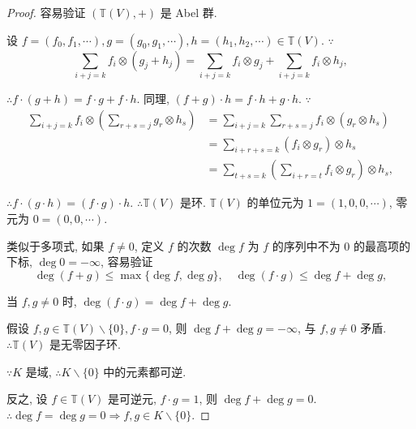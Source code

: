 \documentclass[color=black,device=normal,lang=cn,mode=geye]{elegantnote}
\begin{document}
\begin{proof}
    容易验证 $(\mathbb{T}(V),+)$ 是 Abel 群.

    设 $f=(f_0,f_1,\cdots),g=(g_0,g_1,\cdots),h=(h_1,h_2,\cdots)\in\mathbb{T}(V)$. $\because$
    \[\sum\limits_{i+j=k}f_i\otimes(g_j+h_j)=\sum\limits_{i+j=k}f_i\otimes g_j+\sum\limits_{i+j=k}f_i\otimes h_j,\]

    $\therefore f\cdot(g+h)=f\cdot g+f\cdot h$. 同理, $(f+g)\cdot h=f\cdot h+g\cdot h$. $\because$
    \begin{align*}
        \sum\limits_{i+j=k}f_i\otimes\left(\sum\limits_{r+s=j}g_r\otimes h_s\right) & =\sum\limits_{i+j=k}\sum\limits_{r+s=j}f_i\otimes(g_r\otimes h_s) \\
        & =\sum\limits_{i+r+s=k}(f_i\otimes g_r)\otimes h_s \\
        & =\sum\limits_{t+s=k}\left(\sum\limits_{i+r=t}f_i\otimes g_r\right)\otimes h_s,
    \end{align*}

    $\therefore f\cdot(g\cdot h)=(f\cdot g)\cdot h$. $\therefore\mathbb{T}(V)$ 是环. $\mathbb{T}(V)$ 的单位元为 $1=(1,0,0,\cdots)$, 零元为 $0=(0,0,\cdots)$.

    类似于多项式, 如果 $f\neq0$, 定义 $f$ 的次数 $\deg f$ 为 $f$ 的序列中不为 $0$ 的最高项的下标, $\deg 0=-\infty$, 容易验证
    \[\deg(f+g)\leq\max\{\deg f,\deg g\},\quad\deg(f\cdot g)\leq\deg f+\deg g,\]

    当 $f,g\neq0$ 时, $\deg(f\cdot g)=\deg f+\deg g$.

    假设 $f,g\in\mathbb{T}(V)\backslash\{0\},f\cdot g=0$, 则 $\deg f+\deg g=-\infty$, 与 $f,g\neq0$ 矛盾. $\therefore\mathbb{T}(V)$ 是无零因子环.

    $\because K$ 是域, $\therefore K\backslash\{0\}$ 中的元素都可逆.

    反之, 设 $f\in\mathbb{T}(V)$ 是可逆元, $f\cdot g=1$, 则 $\deg f+\deg g=0$. $\therefore\deg f=\deg g=0\Rightarrow f,g\in K\backslash\{0\}$.
\end{proof}
\end{document}
